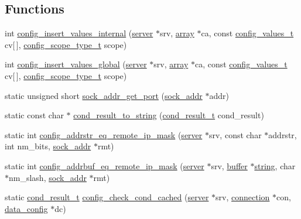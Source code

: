 \subsection*{Functions}
\begin{DoxyCompactItemize}
\item 
int \hyperlink{configfile-glue_8c_a87d57c57a19525dcd9a7e285a8d54025}{config\-\_\-insert\-\_\-values\-\_\-internal} (\hyperlink{structserver}{server} $\ast$srv, \hyperlink{structarray}{array} $\ast$ca, const \hyperlink{structconfig__values__t}{config\-\_\-values\-\_\-t} cv\mbox{[}$\,$\mbox{]}, \hyperlink{base_8h_a909d47eef1da468e4e0f0f29aab87fca}{config\-\_\-scope\-\_\-type\-\_\-t} scope)
\item 
int \hyperlink{configfile-glue_8c_adaaeb594ea70960f1dbefabb42a1d0a2}{config\-\_\-insert\-\_\-values\-\_\-global} (\hyperlink{structserver}{server} $\ast$srv, \hyperlink{structarray}{array} $\ast$ca, const \hyperlink{structconfig__values__t}{config\-\_\-values\-\_\-t} cv\mbox{[}$\,$\mbox{]}, \hyperlink{base_8h_a909d47eef1da468e4e0f0f29aab87fca}{config\-\_\-scope\-\_\-type\-\_\-t} scope)
\item 
static unsigned short \hyperlink{configfile-glue_8c_aa77b0c12194d46a5ae53cf1fc2443ff0}{sock\-\_\-addr\-\_\-get\-\_\-port} (\hyperlink{unionsock__addr}{sock\-\_\-addr} $\ast$addr)
\item 
static const char $\ast$ \hyperlink{configfile-glue_8c_aac505b848dbe1b63bc025c12da5c6a7b}{cond\-\_\-result\-\_\-to\-\_\-string} (\hyperlink{base_8h_a842aa102e2ce2846d02dce7b547a031c}{cond\-\_\-result\-\_\-t} cond\-\_\-result)
\item 
static int \hyperlink{configfile-glue_8c_a0ff96ac52908f6adcc1aec97de1bb559}{config\-\_\-addrstr\-\_\-eq\-\_\-remote\-\_\-ip\-\_\-mask} (\hyperlink{structserver}{server} $\ast$srv, const char $\ast$addrstr, int nm\-\_\-bits, \hyperlink{unionsock__addr}{sock\-\_\-addr} $\ast$rmt)
\item 
static int \hyperlink{configfile-glue_8c_a2034145704131880c4bba67f5ab0e39d}{config\-\_\-addrbuf\-\_\-eq\-\_\-remote\-\_\-ip\-\_\-mask} (\hyperlink{structserver}{server} $\ast$srv, \hyperlink{structbuffer}{buffer} $\ast$\hyperlink{test__configfile_8c_ae1adbce218e7a9d09164012443191d24}{string}, char $\ast$nm\-\_\-slash, \hyperlink{unionsock__addr}{sock\-\_\-addr} $\ast$rmt)
\item 
static \hyperlink{base_8h_a842aa102e2ce2846d02dce7b547a031c}{cond\-\_\-result\-\_\-t} \hyperlink{configfile-glue_8c_ae6185e2927c2b7078117c06e58ca2b7c}{config\-\_\-check\-\_\-cond\-\_\-cached} (\hyperlink{structserver}{server} $\ast$srv, \hyperlink{structconnection}{connection} $\ast$con, \hyperlink{structdata__config}{data\-\_\-config} $\ast$dc)

\end{DoxyCompactItemize}
